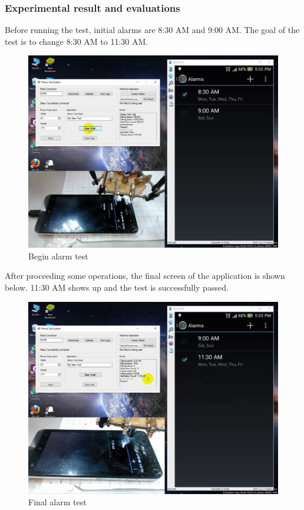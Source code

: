 \subsubsection{Experimental result and evaluations}
Before running the test, initial alarms are 8:30 AM and 9:00 AM. The goal of the test is to change 8:30 AM to 11:30 AM.
	\begin{figure}[H]
		\centering
		\includegraphics[width=\maxwidth{15cm}, keepaspectratio]{Chapters/Fig/alarm_start.png}
		\caption{Begin alarm test}
		\label{fig:alarm_start}
	\end{figure}
After proceeding some operations, the final screen of the application is shown below. 11:30 AM shows up and the test is successfully passed.
	\begin{figure}[H]
		\centering
		\includegraphics[width=\maxwidth{15cm}, keepaspectratio]{Chapters/Fig/alarm_final.png}
		\caption{Final alarm test}
		\label{fig:alarm_final}
	\end{figure}

